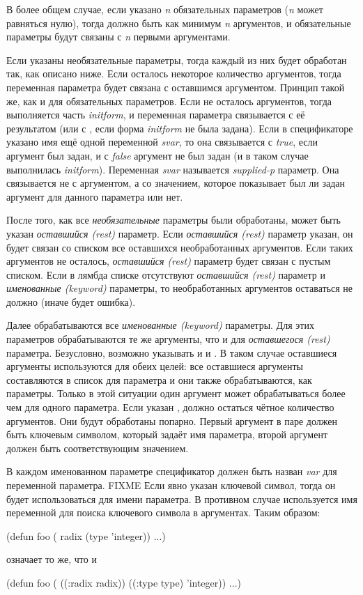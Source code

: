 В более общем случае, если указано \emph{n} обязательных параметров
(\emph{n} может равняться нулю), тогда должно быть как минимум \emph{n}
аргументов, и обязательные параметры будут связаны с \emph{n} первыми
аргументами.

Если указаны необязательные параметры, тогда каждый из них будет обработан так,
как описано ниже. Если осталось некоторое количество аргументов, тогда
переменная параметра  будет связана с оставшимся аргументом. Принцип
такой же, как и для обязательных параметров. Если не осталось аргументов, тогда
выполняется часть \emph{initform}, и переменная
параметра связывается с её результатом (или с {\false}, если форма
\emph{initform} не была задана).
Если в спецификаторе указано имя ещё одной переменной \emph{svar}, то она
связывается с \emph{true}, если аргумент был задан, и с \emph{false}
аргумент не был задан (и в таком случае выполнилась \emph{initform}).
Переменная \emph{svar} называется \emph{supplied-p} параметр. Она
связывается не с аргументом, а со значением, которое показывает был ли задан
аргумент для данного параметра или нет.

После того, как все \emph{необязательные} параметры были обработаны, может
быть указан \emph{оставшийся (rest)} параметр.
Если \emph{оставшийся (rest)} параметр указан, он будет связан со списком все
оставшихся необработанных аргументов. Если таких аргументов не осталось,
\emph{оставшийся (rest)} параметр будет связан с пустым списком. Если в лямбда
списке отсутствуют \emph{оставшийся (rest)} параметр и \emph{именованные
  (keyword)} параметры, то необработанных аргументов оставаться не должно (иначе
будет ошибка).

Далее обрабатываются все \emph{именованные (keyword)} параметры.
Для этих параметров обрабатываются те же аргументы, что и для
\emph{оставшегося (rest)} параметра.
Безусловно, возможно указывать и  и . В таком случае
оставшиеся аргументы используются для обеих целей:
все оставшиеся аргументы составляются в список для  параметра и они
также обрабатываются, как  параметры. Только в этой ситуации один
аргумент может обрабатываться более чем для одного параметра.
Если указан , должно остаться чётное количество аргументов. Они будут
обработаны попарно. Первый аргумент в паре должен быть ключевым символом,
который задаёт имя параметра, второй аргумент должен быть соответствующим
значением.

В каждом именованном параметре спецификатор должен быть назван \emph{var} для
переменной параметра. FIXME
Если явно указан ключевой символ, тогда он будет использоваться для имени
параметра. В противном случае используется имя переменной  для поиска
ключевого символа в аргументах. Таким образом:
\begin{lisp}
(defun foo ( radix (type 'integer)) ...)
\end{lisp}
означает то же, что и
\begin{lisp}
(defun foo ( ((:radix radix)) ((:type type) 'integer)) ...)
\end{lisp}

